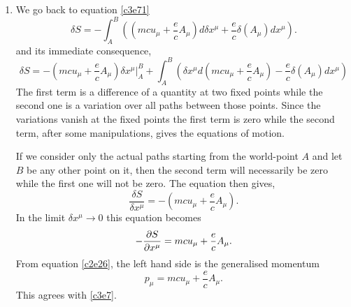 \begin{enumerate}
\item We go back to equation \eqref{c3e71}
\[
\delta S = -\int_A^B\left((mcu_\mu + \frac{e}{c}A_\mu)d\delta x^\mu + \frac{e}{c}\delta(A_\mu) dx^\mu\right).
\]
and its immediate consequence,
\[
\delta S = -\left(mcu_\mu + \frac{e}{c}A_\mu\right)\delta x^\mu\big|_A^B + 
 \int_A^B \left(\delta x^\mu d\left(mcu_\mu + \frac{e}{c}A_\mu\right) - 
 \frac{e}{c}\delta(A_\mu) dx^\mu\right)
\]
The first term is a difference of a quantity at two fixed points while the second
one is a variation over all paths between those points. Since the variations 
vanish at the fixed points the first term is zero while the second term, after some
manipulations, gives the equations of motion.

If we consider only the actual paths starting from the world-point $A$ and let $B$
be any other point on it, then the second term will necessarily be zero while the 
first one will not be zero. The equation then gives,
\[
\frac{\delta S}{\delta x^\mu} = -\left(mcu_\mu + \frac{e}{c}A_\mu\right).
\]
In the limit $\delta x^\mu \rightarrow 0$ this equation becomes
\begin{equation}\label{c3e78}
-\frac{\partial{S}}{\partial{x^\mu}} = mcu_\mu + \frac{e}{c}A_\mu.
\end{equation}
From equation \eqref{c2e26}, the left hand side is the generalised momentum
\begin{equation}\label{c3e79}
p_\mu = mcu_\mu + \frac{e}{c}A_\mu.
\end{equation}
This agrees with \eqref{c3e7}.


\end{enumerate}
